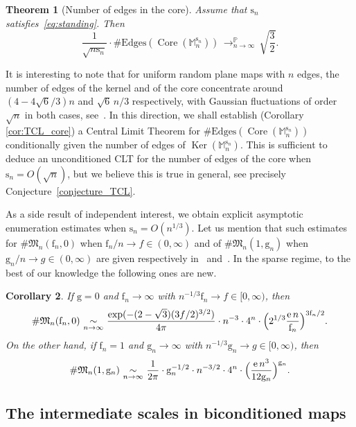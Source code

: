 \documentclass[10pt]{amsart}
\theoremstyle{plain}
\newtheorem{theorem}{Theorem}
\newtheorem{corollary}[theorem]{Corollary}
\theoremstyle{definition}
\theoremstyle{remark}
\renewcommand{\P}{\mathbb{P}}
\newcommand{\e}{\operatorname{e}}
\newcommand{\Mapb}{\mathbb{M}}
\newcommand{\face}{\mathrm{f}}
\newcommand{\gen}{\mathrm{g}}
\newcommand{\spar}{\mathrm{s}}
\DeclareMathOperator{\Core}{Core}
\DeclareMathOperator{\Ker}{Ker}
\newcommand{\cvproba}[1][n]{\,\mathop{\longrightarrow}^{\P}_{#1 \to \infty}\,}
\newcommand{\equi}[1][n]{\,\mathop{\sim}^{}_{#1 \to \infty}\,}
\begin{document}
\begin{theorem}[Number of edges in the core]
\label{thm:aretes_core}
Assume that $\spar_n$ satisfies~\eqref{eq:standing}.
Then
\[
\frac{1}{\sqrt{n\spar_n}} \cdot \#\mathrm{Edges}(\Core(\Mapb_n^{\spar_{n}})) \cvproba \sqrt{\frac{3}{2}}.
\]
\end{theorem}

It is interesting to note that for uniform random plane maps with $n$ edges, the number of edges of the kernel and of the core concentrate around $(4-4 \sqrt{6}/3)n$ and $\sqrt{6}\,n/3$ respectively, with Gaussian fluctuations of order $\sqrt{n}$ in both cases, see~\cite[Th.\,5]{NR18}. In this direction, we shall establish (Corollary \ref{cor:TCL_core}) a Central Limit Theorem for $\#\mathrm{Edges}(\Core(\Mapb_n^{\spar_{n}}))$ conditionally given the number of edges of $\Ker(\Mapb_n^{\spar_{n}})$.
This is sufficient to deduce an unconditioned CLT for the number of edges of the core when $\spar_n = O(\sqrt{n})$, but we believe this is true in general, see precisely Conjecture~\ref{conjecture_TCL}.

As a side result of independent interest, we obtain explicit asymptotic enumeration estimates when $\spar_n= O(n^{1/3})$. Let us mention that such estimates for $\# \mathfrak{M}_{n}(\face_{n},0)$ when $\face_{n}/n \rightarrow f \in (0,\infty)$ and of $\# \mathfrak{M}_{n}(1,\gen_{n})$ when $\gen_{n}/n \rightarrow g \in (0,\infty)$ are given respectively in~\cite[Th.\,1]{BCR93} and~\cite[Th.\,3]{ACCR13}. In the sparse regime, to the best of our knowledge the following ones are new.

\begin{corollary}
\label{cor:enumeration}
If $\gen=0$ and $\face_n \to \infty$ with $n^{-1/3} \face_n \to f \in [0,\infty)$, then
\[
\# \mathfrak{M}_n(\face_n,0)
\equi \frac{\exp(-(2-\sqrt{3}) (3f/2)^{3/2})}{4 \pi} \cdot n^{-3} \cdot 4^{n} \cdot \Bigl(2^{1/3} \frac{\e n}{\face_{n}}\Bigr)^{3\face_{n}/2}.
\]
On the other hand, if $\face_n=1$ and $\gen_n \to \infty$ with $n^{-1/3} \gen_n \to g \in [0,\infty)$, then
\[
\# \mathfrak{M}_n(1,\gen_n)
\equi \frac{1}{2\pi } \cdot \gen_n^{-1/2} \cdot n^{-3/2} \cdot 4^{n} \cdot \Bigl(\frac{\e n^3}{12 \gen_n}\Bigr)^{\gen_n}.
\]
\end{corollary}

\subsection{The intermediate scales in biconditioned maps}
\end{document}
